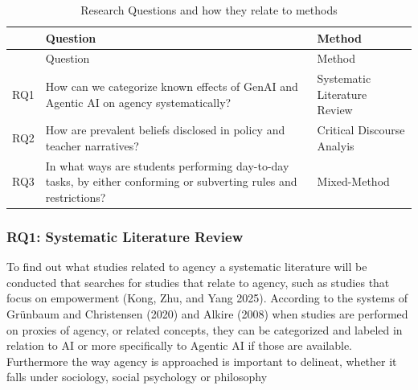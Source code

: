 \documentclass[
  letterpaper,
  DIV=11,
  numbers=noendperiod]{scrartcl}
\begin{document}
\begin{longtable}[]{@{}
  >{\raggedright\arraybackslash}p{}
  >{\raggedright\arraybackslash}p{}
  >{\raggedright\arraybackslash}p{}@{}}
\caption{Research Questions and how they relate to
methods}\tabularnewline
\toprule\noalign{}
\begin{minipage}[b]{\linewidth}\raggedright
\end{minipage} & \begin{minipage}[b]{\linewidth}\raggedright
Question
\end{minipage} & \begin{minipage}[b]{\linewidth}\raggedright
Method
\end{minipage} \\
\midrule\noalign{}
\endfirsthead
\toprule\noalign{}
\begin{minipage}[b]{\linewidth}\raggedright
\end{minipage} & \begin{minipage}[b]{\linewidth}\raggedright
Question
\end{minipage} & \begin{minipage}[b]{\linewidth}\raggedright
Method
\end{minipage} \\
\midrule\noalign{}
\endhead
\bottomrule\noalign{}
\endlastfoot
RQ1 & How can we categorize known effects of GenAI and Agentic AI on
agency systematically? & Systematic Literature Review \\
RQ2 & How are prevalent beliefs disclosed in policy and teacher
narratives? & Critical Discourse Analyis \\
RQ3 & In what ways are students performing day-to-day tasks, by either
conforming or subverting rules and restrictions? & Mixed-Method \\
\end{longtable}

\subsubsection{RQ1: Systematic Literature
Review}\label{rq1-systematic-literature-review}

To find out what studies related to agency a systematic literature will
be conducted that searches for studies that relate to agency, such as
studies that focus on empowerment (Kong, Zhu, and Yang 2025). According
to the systems of Grünbaum and Christensen (2020) and Alkire (2008) when
studies are performed on proxies of agency, or related concepts, they
can be categorized and labeled in relation to AI or more specifically to
Agentic AI if those are available. Furthermore the way agency is
approached is important to delineat, whether it falls under sociology,
social psychology or philosophy
\end{document}
